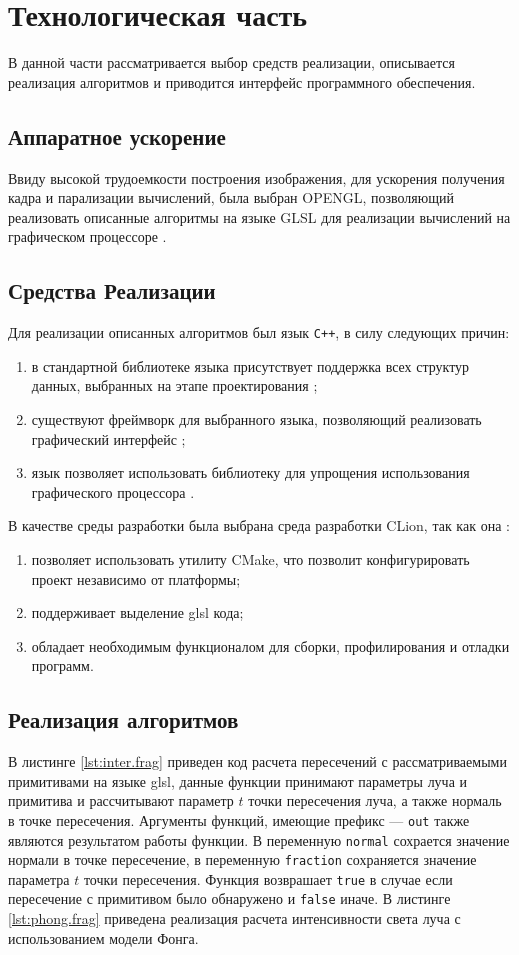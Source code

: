 \chapter{Технологическая часть}
В данной части рассматривается выбор средств реализации, описывается реализация алгоритмов и приводится интерфейс программного
обеспечения.

\section{Аппаратное ускорение}
Ввиду высокой трудоемкости построения изображения, для ускорения получения кадра и
парализации вычислений, была выбран OPENGL, позволяющий реализовать описанные алгоритмы на языке GLSL для реализации вычислений на графическом процессоре \cite{ray_trace_glsl}.

\section{Средства Реализации}
Для реализации описанных алгоритмов был язык \texttt{C++}, в силу следующих причин:
\begin{enumerate}
	\item в стандартной библиотеке языка присутствует поддержка всех структур данных,
	выбранных на этапе проектирования \cite{STL};
	\item существуют фреймворк для выбранного языка, позволяющий реализовать графический интерфейс \cite{qt_c++};
	\item язык позволяет использовать библиотеку для упрощения использования графического процессора \cite{qt_opengl}.
\end{enumerate}

В качестве среды разработки была выбрана среда разработки  CLion, так как она \cite{clion}:
\begin{enumerate}
    \item позволяет использовать утилиту CMake, что позволит конфигурировать проект независимо от платформы;
    \item поддерживает выделение glsl кода;
    \item обладает необходимым функционалом для сборки, профилирования и отладки программ.
\end{enumerate}


\section{Реализация алгоритмов}
В листинге \ref{lst:inter.frag} приведен код расчета пересечений с рассматриваемыми примитивами на языке glsl, данные функции принимают
параметры луча и примитива  и рассчитывают параметр $t$ точки пересечения луча, а также нормаль   в точке пересечения.
Аргументы функций, имеющие префикс --- \texttt{out} также являются результатом работы функции.
В переменную \texttt{normal} сохрается значение нормали в точке пересечение, в переменную \texttt{fraction} сохраняется 
значение параметра $t$ точки пересечения. Функция возврашает \texttt{true} в случае если пересечение с примитивом было обнаружено и \texttt{false}
иначе.
В листинге \ref{lst:phong.frag} приведена реализация  расчета интенсивности света 
луча с использованием модели Фонга.

